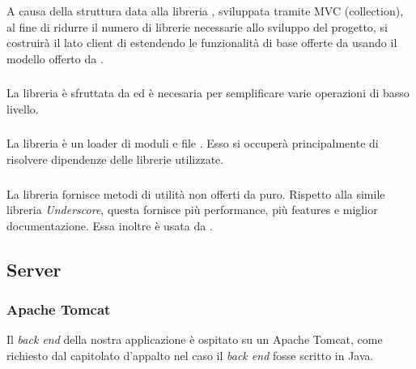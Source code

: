 A causa della struttura data alla libreria \jointjs{}, sviluppata tramite MVC (collection), al fine di ridurre il numero di librerie necessarie allo sviluppo del progetto, si costruirà il lato client di \proj{} estendendo le funzionalità di base offerte da \jointjs{} usando il modello \mvc{} offerto da \backbonejs{}.	

\subsubsection{\jquery}
La libreria \jquery{} è sfruttata da \jointjs{} ed è necesaria per semplificare varie operazioni di basso livello.

\subsubsection{\requirejs}
La libreria \requirejs{} è un loader di moduli e file \js{}. Esso si occuperà principalmente di risolvere dipendenze delle librerie \js{} utilizzate.

\subsubsection{\lodash}
La libreria \lodash{} fornisce metodi di utilità non offerti da \js{} puro. Rispetto alla simile libreria \emph{Underscore}, questa fornisce più performance, più features e miglior documentazione. Essa inoltre è usata da \jointjs{}.



\subsection{Server}

\subsubsection{Apache Tomcat}
Il \emph{back end} della nostra applicazione è ospitato su un  Apache Tomcat, come richiesto dal capitolato d'appalto nel caso il \emph{back end} fosse scritto in Java.

